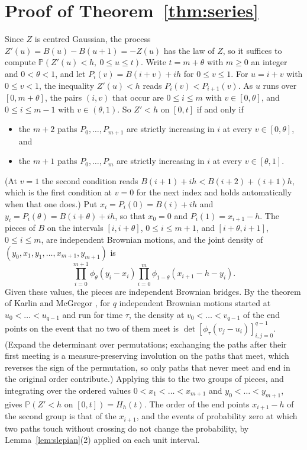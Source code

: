 \documentclass[11pt]{amsart}
\theoremstyle{remark}
\numberwithin{equation}{section}
\newcommand{\PP}{\mathbb{P}}
\begin{document}
\section{Proof of Theorem~\ref{thm:series}}\label{sec:series}

Since $Z$ is centred Gaussian, the process $Z'(u)=B(u)-B(u+1)=-Z(u)$ has the law of $Z$, so it suffices to compute $\PP(Z'(u)<h,\ 0\le u\le t)$. Write $t=m+\theta$ with $m\ge0$ an integer and $0<\theta<1$, and let $P_i(v)=B(i+v)+ih$ for $0\le v\le1$. For $u=i+v$ with $0\le v<1$, the inequality $Z'(u)<h$ reads $P_i(v)<P_{i+1}(v)$. As $u$ runs over $[0,m+\theta]$, the pairs $(i,v)$ that occur are $0\le i\le m$ with $v\in[0,\theta]$, and $0\le i\le m-1$ with $v\in(\theta,1)$. So $Z'<h$ on $[0,t]$ if and only if
\begin{itemize}
\item the $m+2$ paths $P_0,\dots,P_{m+1}$ are strictly increasing in $i$ at every $v\in[0,\theta]$, and
\item the $m+1$ paths $P_0,\dots,P_m$ are strictly increasing in $i$ at every $v\in[\theta,1]$.
\end{itemize}
(At $v=1$ the second condition reads $B(i+1)+ih<B(i+2)+(i+1)h$, which is the first condition at $v=0$ for the next index and holds automatically when that one does.) Put $x_i=P_i(0)=B(i)+ih$ and $y_i=P_i(\theta)=B(i+\theta)+ih$, so that $x_0=0$ and $P_i(1)=x_{i+1}-h$. The pieces of $B$ on the intervals $[i,i+\theta]$, $0\le i\le m+1$, and $[i+\theta,i+1]$, $0\le i\le m$, are independent Brownian motions, and the joint density of $(y_0,x_1,y_1,\dots,x_{m+1},y_{m+1})$ is
\[
\prod_{i=0}^{m+1}\phi_\theta(y_i-x_i)\prod_{i=0}^m\phi_{1-\theta}(x_{i+1}-h-y_i).
\]
Given these values, the pieces are independent Brownian bridges. By the theorem of Karlin and McGregor \cite{KM}, for $q$ independent Brownian motions started at $u_0<\dots<u_{q-1}$ and run for time $\tau$, the density at $v_0<\dots<v_{q-1}$ of the end points on the event that no two of them meet is $\det[\phi_\tau(v_j-u_i)]_{i,j=0}^{q-1}$. (Expand the determinant over permutations; exchanging the paths after their first meeting is a measure-preserving involution on the paths that meet, which reverses the sign of the permutation, so only paths that never meet and end in the original order contribute.) Applying this to the two groups of pieces, and integrating over the ordered values $0<x_1<\dots<x_{m+1}$ and $y_0<\dots<y_{m+1}$, gives $\PP(Z'<h\text{ on }[0,t])=H_h(t)$. The order of the end points $x_{i+1}-h$ of the second group is that of the $x_{i+1}$, and the events of probability zero at which two paths touch without crossing do not change the probability, by Lemma~\ref{lem:slepian}(2) applied on each unit interval.
\end{document}
